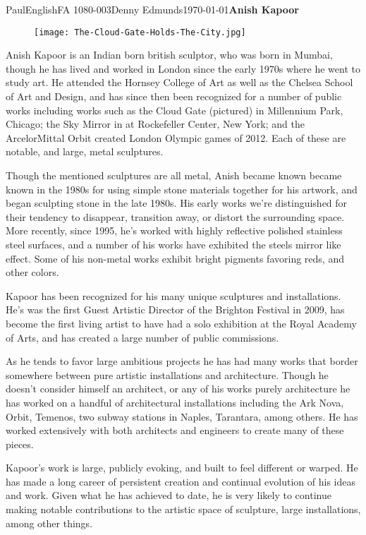 \documentclass[12pt,onecolumn]{article}
\begin{document}
\begin{mla}{Paul}{English}{FA 1080-003}{Denny Edmunds}{\today}{\textbf{Anish Kapoor}}


\begin{figure}[h]
\centering
\texttt{[image: The-Cloud-Gate-Holds-The-City.jpg]}
\end{figure}

Anish Kapoor is an Indian born british sculptor, who was born in Mumbai, though he has lived and worked in London since the early 1970s where he went to study art. He attended the Hornsey College of Art as well as the Chelsea School of Art and Design, and has since then been recognized for a number of public works including works such as the Cloud Gate (pictured) in Millennium Park, Chicago; the Sky Mirror in at Rockefeller Center, New York; and the ArcelorMittal Orbit created London Olympic games of 2012. Each of these are notable, and large, metal sculptures.

Though the mentioned sculptures are all metal, Anish became known became known in the 1980s for using simple stone materials together for his artwork, and began sculpting stone in the late 1980s. His early works we're distinguished for their tendency to disappear, transition away, or distort the surrounding space. More recently, since 1995, he's worked with highly reflective polished stainless steel surfaces, and a number of his works have exhibited the steels mirror like effect. Some of his non-metal works exhibit bright pigments favoring reds, and other colors.

Kapoor has been recognized for his many unique sculptures and installations. He's was the first Guest Artistic Director of the Brighton Festival in 2009, has become the first living artist to have had a solo exhibition at the Royal Academy of Arts, and has created a large number of public commissions.

As he tends to favor large ambitious projects he has had many works that border somewhere between pure artistic installations and architecture. Though he doesn't consider himself an architect, or any of his works purely architecture he has worked on a handful of architectural installations including the Ark Nova, Orbit, Temenos, two subway stations in Naples, Tarantara, among others. He has worked extensively with both architects and engineers to create many of these pieces.

Kapoor's work is large, publicly evoking, and built to feel different or warped. He has made a long career of persistent creation and continual evolution of his ideas and work. Given what he has achieved to date, he is very likely to continue making notable contributions to the artistic space of sculpture, large installations, among other things.

\end{mla}
\end{document}
